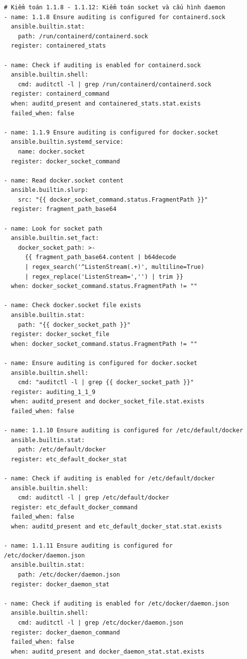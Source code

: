 {\begin{verbatim}
# Kiểm toán 1.1.8 - 1.1.12: Kiểm toán socket và cấu hình daemon
- name: 1.1.8 Ensure auditing is configured for containerd.sock
  ansible.builtin.stat:
    path: /run/containerd/containerd.sock
  register: containered_stats

- name: Check if auditing is enabled for containerd.sock
  ansible.builtin.shell:
    cmd: auditctl -l | grep /run/containerd/containerd.sock
  register: containerd_command
  when: auditd_present and containered_stats.stat.exists
  failed_when: false

- name: 1.1.9 Ensure auditing is configured for docker.socket
  ansible.builtin.systemd_service:
    name: docker.socket
  register: docker_socket_command

- name: Read docker.socket content
  ansible.builtin.slurp:
    src: "{{ docker_socket_command.status.FragmentPath }}"
  register: fragment_path_base64

- name: Look for socket path
  ansible.builtin.set_fact:
    docker_socket_path: >-
      {{ fragment_path_base64.content | b64decode
      | regex_search('^ListenStream(.+)', multiline=True)
      | regex_replace('ListenStream=','') | trim }}
  when: docker_socket_command.status.FragmentPath != ""

- name: Check docker.socket file exists
  ansible.builtin.stat:
    path: "{{ docker_socket_path }}"
  register: docker_socket_file
  when: docker_socket_command.status.FragmentPath != ""

- name: Ensure auditing is configured for docker.socket
  ansible.builtin.shell:
    cmd: "auditctl -l | grep {{ docker_socket_path }}"
  register: auditing_1_1_9
  when: auditd_present and docker_socket_file.stat.exists
  failed_when: false

- name: 1.1.10 Ensure auditing is configured for /etc/default/docker
  ansible.builtin.stat:
    path: /etc/default/docker
  register: etc_default_docker_stat

- name: Check if auditing is enabled for /etc/default/docker
  ansible.builtin.shell:
    cmd: auditctl -l | grep /etc/default/docker
  register: etc_default_docker_command
  failed_when: false
  when: auditd_present and etc_default_docker_stat.stat.exists

- name: 1.1.11 Ensure auditing is configured for /etc/docker/daemon.json
  ansible.builtin.stat:
    path: /etc/docker/daemon.json
  register: docker_daemon_stat

- name: Check if auditing is enabled for /etc/docker/daemon.json
  ansible.builtin.shell:
    cmd: auditctl -l | grep /etc/docker/daemon.json
  register: docker_daemon_command
  failed_when: false
  when: auditd_present and docker_daemon_stat.stat.exists


\end{verbatim}}
